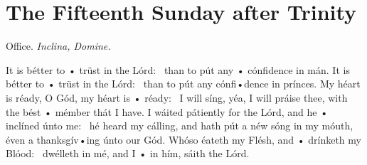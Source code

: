 \section{The Fifteenth Sunday after Trinity}
\centerline{Office. \emph{Inclina, Domine.}}

 It is bétter to • trüst in the Lórd: \star\ than to pút any • cónfidence in mán. \V It is bétter to • trüst in the Lórd: \star\ than to pút any cónfi•dence in prínces.  \V My héart is réady, O Gód, my héart is • réady: \star\ I will síng, yéa, I will práise thee, with the bést • mémber thát I have.  I wáited pátiently for the Lórd, and he • inclíned únto me: \star\ hé heard my cálling, and hath pút a néw sóng in my móuth, éven a thanksgív•ing únto our Gód.  Whóso éateth my Flésh, and • drínketh my Blóod: \star\ dwélleth in mé, and I • in hím, sáith the Lórd.

